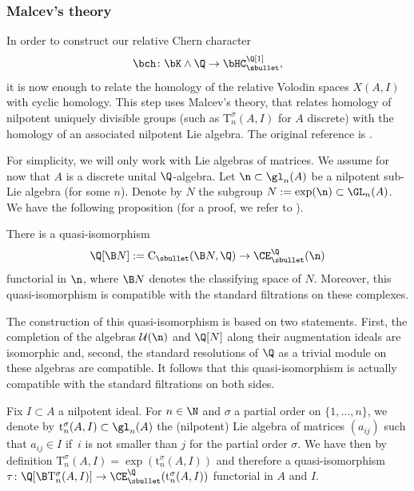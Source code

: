 \subsubsection{Malcev's theory}
In order to construct our relative Chern character
\[
\bch \colon \bK \wedge \Q \to \bHC_\sbullet^\Q[1],
\]
it is now enough to relate the homology of the relative Volodin spaces $X(A,I)$ with cyclic homology.
This step uses Malcev's theory, that relates homology of nilpotent uniquely divisible groups (such as $\mathrm{T}^\sigma_n(A,I)$ for $A$ discrete) with the homology of an associated nilpotent Lie algebra.
The original reference is \cite{malcev:lie}.

For simplicity, we will only work with Lie algebras of matrices. We assume for now that $A$ is a discrete unital $\Q$-algebra. Let $\n \subset \gl_n(A)$ be a nilpotent sub-Lie algebra (for some $n$). Denote by $N$ the subgroup $N := \exp(\n) \subset \GL_n(A)$.
We have the following proposition (for a proof,
we refer to \cite[Th.\,5.11]{suslinwodzicki}).
\begin{prop}\label{prop:malcev}
There is a quasi-isomorphism
\[
\Q[\B N] := \mathrm C_\sbullet(\B N, \Q) \to \CE_\sbullet^\Q(\n)
\]
functorial in $\n$, where $\B N$ denotes the classifying space of $N$.
Moreover, this quasi-isomorphism is compatible with the standard filtrations on these complexes.
\end{prop}
The construction of this quasi-isomorphism is based on two statements. First, the completion of the algebras $\mathcal U(\n)$ and $\Q[N]$ along their augmentation ideals are isomorphic and, second, the standard resolutions of $\Q$ as a trivial module on these algebras are compatible.
It follows that this quasi-isomorphism is actually compatible with the standard filtrations on both sides.

Fix $I \subset A$ a nilpotent ideal. For $n \in \N$ and $\sigma$ a partial order on $\{1, \dots, n\}$, we denote by $\mathrm{t}^\sigma_n(A,I) \subset \gl_n(A)$ the (nilpotent) Lie algebra of matrices $(a_{ij})$ such that $a_{ij} \in I$ if~$i$ is not smaller than $j$ for the partial order $\sigma$.
We have then by definition $\mathrm{T}^\sigma_n(A,I) = \exp(\mathrm{t}^\sigma_n(A,I))$ and therefore a quasi-isomorphism
$\tau \colon \Q[\B \mathrm{T}^\sigma_n(A,I)] \to \CE_\sbullet^\Q(\mathrm{t}^\sigma_n(A,I))$ functorial in $A$ and $I$.

